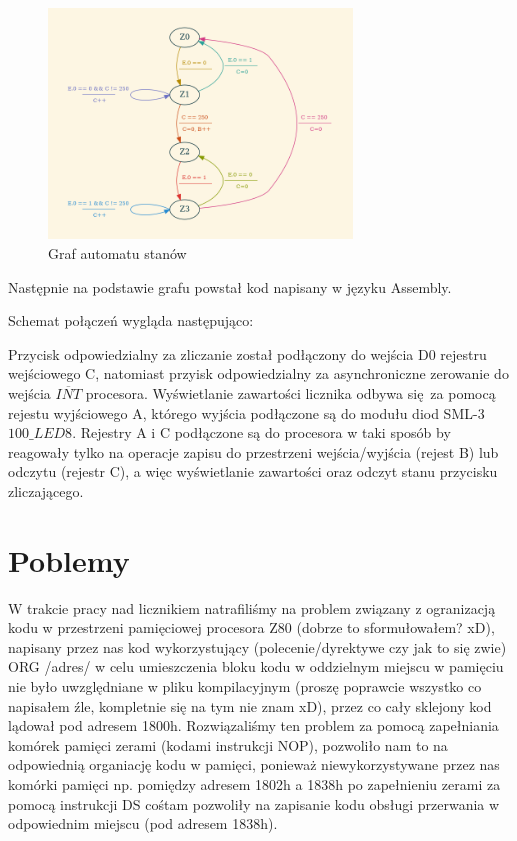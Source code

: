 \documentclass[fleqn]{article}
\begin{document}
\begin{figure}[H]
	\centering
	\includegraphics[width=0.72\textwidth]{img/graph.png}
	\caption{Graf automatu stanów}
	\label{fig:graph}
\end{figure}

Następnie na podstawie grafu powstał kod napisany w języku Assembly.

\noindent\begin{minipage}{.45\textwidth}
	
\end{minipage}\hfill
\noindent\begin{minipage}{.45\textwidth}
	
\end{minipage}\hfill

Schemat połączeń wygląda następująco:


Przycisk odpowiedzialny za zliczanie został podłączony do wejścia D0 rejestru wejściowego C, natomiast przyisk odpowiedzialny za asynchroniczne zerowanie do wejścia $\overline{INT}$ procesora.
Wyświetlanie zawartości licznika odbywa się za pomocą rejestu wyjściowego A, którego wyjścia podłączone są do modułu diod SML-3 $\textit{100\_LED8}$. Rejestry A i C podłączone są do procesora w taki sposób by reagowały tylko na operacje zapisu do przestrzeni wejścia/wyjścia (rejest B) lub odczytu (rejestr C), a więc wyświetlanie zawartości oraz odczyt stanu przycisku zliczającego.


\section{Poblemy}
W trakcie pracy nad licznikiem natrafiliśmy na problem związany z ogranizacją kodu w przestrzeni pamięciowej procesora Z80 (dobrze to sformułowałem? xD), napisany przez nas kod wykorzystujący (polecenie/dyrektywe czy jak to się zwie) ORG /adres/ w celu umieszczenia bloku kodu w oddzielnym miejscu w pamięciu nie było uwzględniane w pliku kompilacyjnym (proszę poprawcie wszystko co napisałem źle, kompletnie się na tym nie znam xD), przez co cały sklejony kod lądował pod adresem 1800h. Rozwiązaliśmy ten problem za pomocą zapełniania komórek pamięci zerami (kodami instrukcji NOP), pozwoliło nam to na odpowiednią organiację kodu w pamięci, ponieważ niewykorzystywane przez nas komórki pamięci np. pomiędzy adresem 1802h a 1838h po zapełnieniu zerami za pomocą instrukcji DS cośtam pozwoliły na zapisanie kodu obsługi przerwania w odpowiednim miejscu (pod adresem 1838h).
\end{document}
